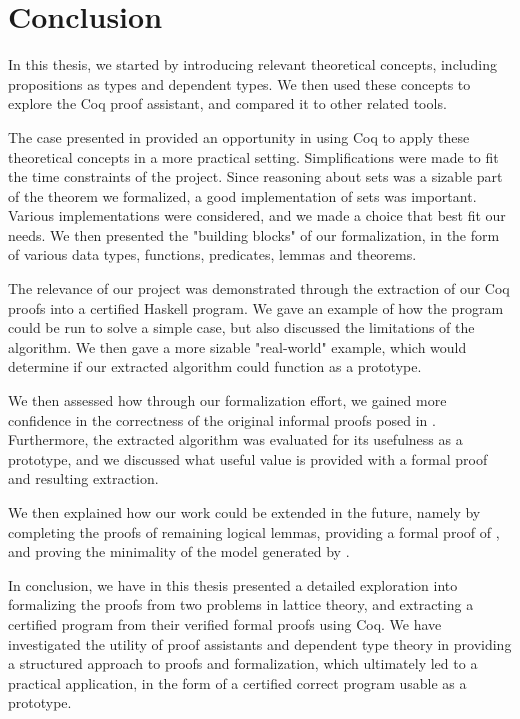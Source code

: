 \chapter{Conclusion}

In this thesis, we started by introducing relevant theoretical concepts,
including propositions as types and dependent types.
We then used these concepts to explore the Coq proof assistant,
and compared it to other related tools.

The case presented in 
provided an opportunity in using Coq to apply these theoretical concepts
in a more practical setting.
Simplifications were made to fit the time constraints of the project.
Since reasoning about sets was a sizable part of the theorem we formalized,
a good implementation of sets was important.
Various implementations were considered, and we made a choice that best fit our needs.
We then presented the "building blocks" of our formalization,
in the form of various data types, functions, predicates, lemmas and theorems.

The relevance of our project was demonstrated through the extraction
of our Coq proofs into a certified Haskell program.
We gave an example of how the program could be run to solve a simple case,
but also discussed the limitations of the algorithm.
We then gave a more sizable "real-world" example,
which would determine if our extracted algorithm could function as a prototype.

We then assessed how through our formalization effort,
we gained more confidence in the correctness of the original informal proofs posed in \cite{mbezem}.
Furthermore, the extracted algorithm was evaluated for its usefulness as a prototype,
and we discussed what useful value is provided with a formal proof and resulting extraction.

We then explained how our work could be extended in the future,
namely by completing the proofs of remaining logical lemmas,
providing a formal proof of , and proving the minimality of the model generated by .

In conclusion, we have in this thesis presented a detailed exploration into formalizing
the proofs from two problems in lattice theory,
and extracting a certified program from their verified formal proofs using Coq.
We have investigated the utility of proof assistants and dependent type theory
in providing a structured approach to proofs and formalization,
which ultimately led to a practical application,
in the form of a certified correct program usable as a prototype.
